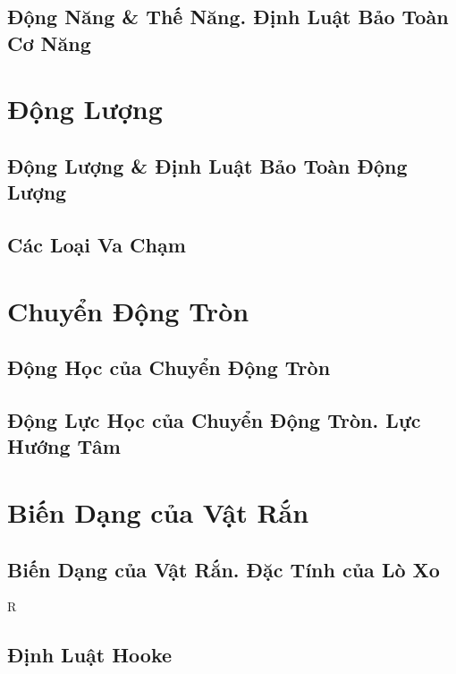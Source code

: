 \documentclass{article}
\numberwithin{equation}{section}
\begin{document}
\subsection{Động Năng \& Thế Năng. Định Luật Bảo Toàn Cơ Năng}


\section{Động Lượng}

\subsection{Động Lượng \& Định Luật Bảo Toàn Động Lượng}


\subsection{Các Loại Va Chạm}


\section{Chuyển Động Tròn}

\subsection{Động Học của Chuyển Động Tròn}


\subsection{Động Lực Học của Chuyển Động Tròn. Lực Hướng Tâm}


\section{Biến Dạng của Vật Rắn}

\subsection{Biến Dạng của Vật Rắn. Đặc Tính của Lò Xo}

R
\subsection{Định Luật Hooke}


\printbibliography[heading=bibintoc]
	
\end{document}
